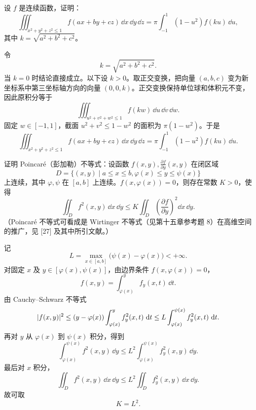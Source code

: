 \begin{xreferenceproblem}[5]
设 $f$ 是连续函数，证明：
  \[
    \iiint_{x^2+y^2+z^2\le1}f(ax+by+cz)\,\dd x\,\dd y\,\dd z
    =\pi\int_{-1}^1(1-u^2)f(ku)\,\dd u,
  \]
  其中 $k=\sqrt{a^2+b^2+c^2}$。
\end{xreferenceproblem}
\begin{xsolution}
令
\[
  k=\sqrt{a^2+b^2+c^2}.
\]
当 $k=0$ 时结论直接成立。以下设 $k>0$。取正交变换，把向量 $(a,b,c)$ 变为新坐标系中第三坐标轴方向的向量 $(0,0,k)$。正交变换保持单位球和体积元不变，因此原积分等于
\[
  \iiint_{u^2+v^2+w^2\le1}f(kw)\,\dd u\,\dd v\,\dd w.
\]
固定 $w\in[-1,1]$，截面 $u^2+v^2\le1-w^2$ 的面积为 $\pi(1-w^2)$。于是
\[
  \boxed{
  \iiint_{x^2+y^2+z^2\le1}f(ax+by+cz)\,\dd x\,\dd y\,\dd z
  =\pi\int_{-1}^1(1-u^2)f(ku)\,\dd u }.
\]
\end{xsolution}


\begin{xreferenceproblem}[6]
证明 Poincaré（彭加勒）不等式：设函数 $f(x,y),\frac{\partial f}{\partial y}(x,y)$ 在闭区域
  \[
    D=\{(x,y)\mid a\le x\le b,\varphi(x)\le y\le\psi(x)\}
  \]
  上连续，其中 $\varphi,\psi$ 在 $[a,b]$ 上连续。$f(x,\varphi(x))=0$，则存在常数 $K>0$，使得
  \[
    \iint_D f^2(x,y)\,\dd x\,\dd y\le K\iint_D\left(\frac{\partial f}{\partial y}\right)^2\dd x\,\dd y.
  \]
  （Poincaré 不等式可看成是 Wirtinger 不等式（见第十五章参考题 8）在高维空间的推广，见 [27] 及其中所引文献。）
\end{xreferenceproblem}
\begin{xsolution}
记
\[
  L=\max_{x\in[a,b]}\bigl(\psi(x)-\varphi(x)\bigr)<+\infty.
\]
对固定 $x$ 及 $y\in[\varphi(x),\psi(x)]$，由边界条件 $f(x,\varphi(x))=0$，
\[
  f(x,y)=\int_{\varphi(x)}^y f_y(x,t)\,\dd t.
\]
由 Cauchy--Schwarz 不等式
\[
  \lvert f(x,y)\rvert^2
  \le(y-\varphi(x))
  \int_{\varphi(x)}^y f_y^2(x,t)\,\mathop{}\!\mathrm{d} t
  \le L\int_{\varphi(x)}^{\psi(x)}f_y^2(x,t)\,\mathop{}\!\mathrm{d} t.
\]
再对 $y$ 从 $\varphi(x)$ 到 $\psi(x)$ 积分，得到
\[
  \int_{\varphi(x)}^{\psi(x)}f^2(x,y)\,\dd y
  \le L^2\int_{\varphi(x)}^{\psi(x)}f_y^2(x,y)\,\dd y.
\]
最后对 $x$ 积分，
\[
  \iint_D f^2(x,y)\,\dd x\,\dd y
  \le L^2\iint_D f_y^2(x,y)\,\dd x\,\dd y.
\]
故可取
\[
  \boxed{K=L^2}.
\]
\end{xsolution}



